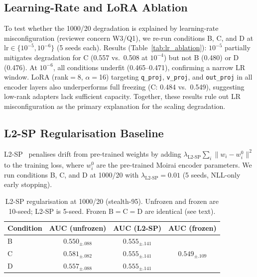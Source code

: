 \subsection{Learning-Rate and LoRA Ablation}
\label{app:lr_ablation}



To test whether the 1000/20 degradation is explained by learning-rate
misconfiguration (reviewer concern W3/Q1), we re-run conditions B, C,
and D at $\text{lr}{\in}\{10^{-5}, 10^{-6}\}$ (5 seeds each).
Results (Table~\ref{tab:lr_ablation}): $10^{-5}$ partially mitigates
degradation for C (0.557 vs.\ 0.508 at $10^{-4}$) but not B (0.480)
or D (0.476).  At $10^{-6}$, all conditions underfit (0.465--0.471),
confirming a narrow LR window.
LoRA (rank$=$8, $\alpha{=}$16) targeting \texttt{q\_proj},
\texttt{v\_proj}, and \texttt{out\_proj} in all encoder layers also
underperforms full freezing (C: 0.484 vs.\ 0.549), suggesting
low-rank adapters lack sufficient capacity.
Together, these results rule out LR misconfiguration as the primary
explanation for the scaling degradation.

\subsection{L2-SP Regularisation Baseline}
\label{app:l2sp}

L2-SP~\cite{li2018l2sp} penalises drift from pre-trained weights by adding
$\lambda_{\text{L2-SP}} \sum_i \|w_i - w_i^0\|^2$ to the training loss,
where $w_i^0$ are the pre-trained Moirai encoder parameters.
We run conditions B, C, and D at 1000/20 with
$\lambda_{\text{L2-SP}} = 0.01$ (5 seeds, NLL-only early stopping).

\begin{table}[h]
\centering
\caption{L2-SP regularisation at 1000/20 (stealth-95).
Unfrozen and frozen are 10-seed; L2-SP is 5-seed.
Frozen B$=$C$=$D are identical (see text).}
\label{tab:l2sp}
\begin{tabular}{lccc}
\toprule
Condition & AUC (unfrozen) & AUC (L2-SP) & AUC (frozen) \\
\midrule
B & $0.550_{\pm.088}$ & $0.555_{\pm.141}$ & \multirow{3}{*}{$0.549_{\pm.109}$} \\
C & $0.581_{\pm.082}$ & $0.555_{\pm.141}$ & \\
D & $0.557_{\pm.088}$ & $0.555_{\pm.141}$ & \\
\bottomrule
\end{tabular}
\end{table}

